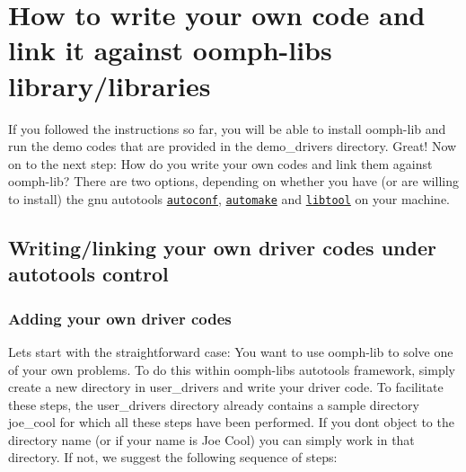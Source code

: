 \hypertarget{index_own}{}\section{How to write your own code and link it against oomph-\/lib\textquotesingle{}s library/libraries}\label{index_own}
If you followed the instructions so far, you will be able to install {\ttfamily oomph-\/lib} and run the demo codes that are provided in the {\ttfamily demo\+\_\+drivers} directory. Great! Now on to the next step\+: How do you write your own codes and link them against {\ttfamily oomph-\/lib}? There are two options, depending on whether you have (or are willing to install) the gnu autotools \href{http://www.gnu.org/software/autoconf/}{\tt autoconf}, \href{http://www.gnu.org/software/automake/}{\tt automake} and \href{http://www.gnu.org/software/libtool/}{\tt libtool} on your machine.\hypertarget{index_have_auto_tools}{}\subsection{Writing/linking your own driver codes under autotools control}\label{index_have_auto_tools}
\hypertarget{index_add_driver}{}\subsubsection{Adding your own driver codes}\label{index_add_driver}
Let\textquotesingle{}s start with the straightforward case\+: You want to use {\ttfamily oomph-\/lib} to solve one of your own problems. To do this within {\ttfamily oomph-\/lib\textquotesingle{}s} autotools framework, simply create a new directory in {\ttfamily user\+\_\+drivers} and write your driver code. To facilitate these steps, the {\ttfamily user\+\_\+drivers} directory already contains a sample directory {\ttfamily joe\+\_\+cool} for which all these steps have been performed. If you don\textquotesingle{}t object to the directory name (or if your name is Joe Cool) you can simply work in that directory. If not, we suggest the following sequence of steps\+:

